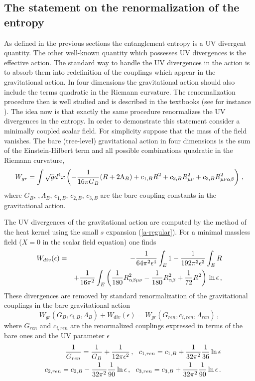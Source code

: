 \documentclass[12pt]{article}
\def\be{\begin{eqnarray}}
\def\ee{\end{eqnarray}}
\def\lb{\label}
\def\o{\over}
\begin{document}
\subsection{The statement on the renormalization of the entropy}

As defined in the  previous sections the   entanglement entropy is a UV divergent quantity.
The other well-known  quantity which possesses  UV divergences is the effective action.
The standard way to handle the UV divergences in the action is to absorb them into redefinition of the
couplings which appear in the gravitational action. In four dimensions the gravitational action should also include the terms
 quadratic in the Riemann curvature.  The renormalization procedure then is well studied and is described in the textbooks (see for instance \cite{Birrell-Davies}). 
The idea now is that  exactly the same procedure renormalizes the UV divergences in the entropy. In order to demonstrate this statement
consider a minimally coupled scalar field. For simplicity suppose that the mass of the field vanishes. 
The bare (tree-level) gravitational action in four dimensions is the sum of the Einstein-Hilbert term and all possible combinations quadratic in the Riemann curvature,
\begin{equation}
W_{gr}=\int{}\sqrt{g}d^4x \left( -{1 \over 16\pi G_B} (R+2\Lambda_B)
+c_{1,B}R^2+c_{2,B}
R^2_{\mu \nu} +c_{3,B} R^2_{\mu\nu\alpha\beta} \right)\, ,
\label{bare action}
\end{equation}
where $G_B,\,, \Lambda_B,\, c_{1,B},\, c_{2,B},\, c_{3,B}$ are the bare coupling constants in the gravitational action.

The UV divergences of the gravitational action are computed by the method of the heat kernel using the small $s$ expansion
(\ref{a-regular}). For a minimal massless field ($X=0$ in the scalar field equation) one finds
\be
W_{div}(\epsilon)&=&-{1\o 64\pi^2\epsilon^4}\int_E 1-{1\o 192\pi^2\epsilon^2}\int_E R\nonumber\\
&& +{1\o 16\pi^2}\int_E\left({1\o 180}R^2_{\alpha\beta\mu\nu}-{1\o 180}R^2_{\alpha\beta}+{1\o 72}R^2\right)\, \ln\epsilon\, ,
\lb{action UV divergences}
\ee
These divergences are removed by  standard renormalization of the gravitational couplings in the bare gravitational action
\begin{equation}
W_{gr}(G_B, c_{i,  B}, \Lambda_B)+W_{div}(\epsilon)=W_{gr} (G_{ren}, c_{i,
ren},\Lambda_{ren})\, ,
\label{renormalization of action}
\end{equation}
where $G_{ren}$ and $c_{i,ren}$ are the renormalized couplings expressed in terms of the bare ones and the UV parameter $\epsilon$
\be
&&{1 \over G_{ren}}={1 \over G_{B}}+ {1 \over 12\pi \epsilon^2}\,
, \ \ c_{1,ren}=c_{1,B}+{1 \over 32\pi^2}{1\o 36}\ln
{\epsilon} \nonumber \\
&&c_{2,ren}=c_{2,B} -{1 \over 32 \pi^2} {1 \over 90} \ln {
\epsilon}
\, , \ \ c_{3,ren}=c_{3,B} +{1 \over 32 \pi^2} {1 \over 90} \ln {
\epsilon}\, .
\lb{renormalized constants}
\ee
\end{document}
